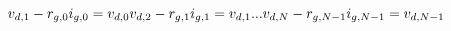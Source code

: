 \documentclass[10pt]{article}
\begin{document}
\[\hspace{-15pt}v_{d,1} - r_{g,0} i_{g,0} = v_{d,0}  \\
v_{d,2} - r_{g,1} i_{g,1}  = v_{d,1}  \\
...\\
v_{d,N} - r_{g,N-1} i_{g,N-1} = v_{d,N-1} \\
\]
\end{document}
